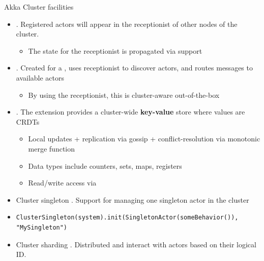 \documentclass[presentation, 9pt]{beamer}\mode<presentation>{\usetheme{AMSBolognaFC}}
\begin{document}
\begin{frame}[c, fragile]{Akka Cluster facilities}
\begin{itemize}
	\item {} \href{https://doc.akka.io/docs/akka/current/typed/actor-discovery.html}{\faLink}. Registered actors will appear in the receptionist of other nodes of the
	cluster.
	\begin{itemize}
		\item The state for the receptionist is propagated via  support
	\end{itemize}
	\item {} \href{https://doc.akka.io/docs/akka/current/typed/routers.html}{\faLink}. Created for a , uses receptionist to discover actors, and
	routes messages to available actors
	\begin{itemize}
		\item By using the receptionist, this is cluster-aware out-of-the-box
	\end{itemize}
	\item {} \href{https://doc.akka.io/docs/akka/current/typed/distributed-data.html}{\faLink}. The  extension provides a cluster-wide
	\textbf{key-value} store where values are CRDTs
	\begin{itemize}
		\item Local updates + replication via gossip + conflict-resolution via monotonic merge function
		\item Data types include counters, sets, maps, registers
		\item Read/write access via 
	\end{itemize}
	\item Cluster singleton \href{https://doc.akka.io/docs/akka/current/typed/cluster-singleton.html}{\faLink}. Support for managing one singleton actor in the cluster
	\item[] \begin{tcolorbox}[left=0pt, top=0pt, bottom=0pt]
		\begin{verbatim}
ClusterSingleton(system).init(SingletonActor(someBehavior()), "MySingleton")
\end{verbatim}
\end{tcolorbox}
	\item Cluster sharding \href{https://doc.akka.io/docs/akka/current/typed/cluster-sharding-concepts.html}{\faLink} \href{https://doc.akka.io/docs/akka/current/typed/cluster-sharding.html}{\faLink} \href{https://github.com/akka/akka-samples/tree/2.6/akka-sample-sharding-scala}{\faLink}. Distributed and interact with actors based on their logical ID.

\end{itemize}
\end{frame}
\end{document}
